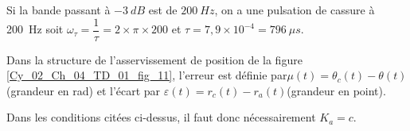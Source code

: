 \ifprof
\begin{corrige}
Si la bande passant à $-\SI{3}{dB}$ est de $\SI{200}{Hz}$, on a une pulsation de cassure à \SI{200}{Hz} soit $\omega_{\tau}=\dfrac{1}{\tau} = 2\times \pi \times 200$ et $\tau = 7,9\times 10^{-4}= \SI{796}{\mu s}$.
\end{corrige}
\else
\fi

\ifprof
\else
Dans la structure de l’asservissement de position de la figure \ref{Cy_02_Ch_04_TD_01_fig_11}, l’erreur est définie par$\mu(t)=\theta_c(t) - \theta(t)$ (grandeur en rad) et l’écart par $\varepsilon(t) = r_c(t)-r_a(t)$(grandeur en point).
\fi

\ifprof
\begin{corrige}
Dans les conditions citées ci-dessus, il faut donc nécessairement $K_a = c$. 
\end{corrige}
\else
\fi

